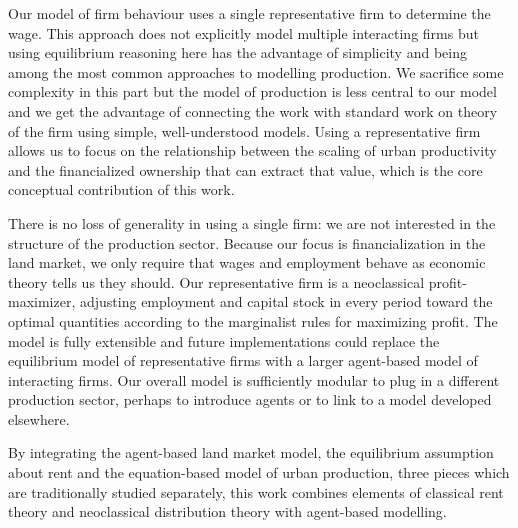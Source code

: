 
Our model of firm behaviour uses a single representative firm to determine the wage. This approach does not explicitly model multiple interacting firms but using  equilibrium reasoning here has the advantage of simplicity and being among the most common approaches to modelling production. 
We sacrifice some complexity in this part but the model of production is less central to our model and we get the advantage of connecting the work with standard work on theory of the firm using simple, well-understood models. 
Using a representative firm allows us to focus on the relationship between the scaling of urban productivity and the financialized ownership that can extract that value, which is the core conceptual contribution of this work. 

There is no loss of generality in using a single firm: we are not interested in the structure of the production sector. Because our focus is financialization in the land market, we only require that wages and employment behave as economic theory tells us they should. Our representative firm is a neoclassical profit-maximizer, adjusting employment and capital stock in every period toward the optimal quantities according to the marginalist rules for maximizing profit.  The model is fully extensible and future implementations could replace the equilibrium model of representative firms with a larger agent-based model of interacting firms. Our overall model is sufficiently modular to plug in a different production sector, perhaps to introduce agents or to link to a model developed elsewhere. 


By integrating the agent-based land market model, the equilibrium assumption about rent and the equation-based model of urban production, three pieces which are traditionally studied separately, this work combines elements of classical rent theory and neoclassical distribution theory with agent-based modelling.




